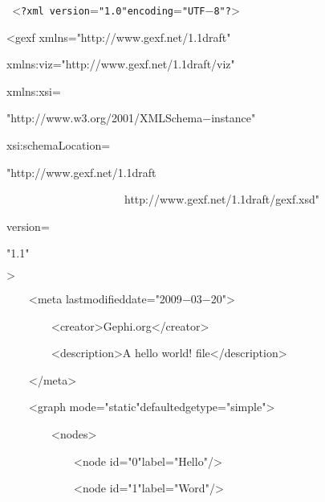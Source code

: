 


{
\tt
{\hlstd }{\hlkwa $\mathord{<}$?xml version$\mathord{=}$}{\hlstr "1.0"}{\hlkwa  encoding$\mathord{=}$}{\hlstr "UTF$\mathord{-}$8"}{\hlkwa ?$\mathord{>}$}{\hlstd }\leavevmode\par
{\hlkwa $\mathord{<}$gexf xmlns$\mathord{=}$}{\hlstr "http://www.gexf.net/1.1draft"}{\hlkwa }\leavevmode\par
{\hlstd  xmlns:viz$\mathord{=}$}{\hlstr "http://www.gexf.net/1.1draft/viz"}{\hlstd \leavevmode\par
 xmlns:xsi$\mathord{=}$}{\hlstr "http://www.w3.org/2001/XMLSchema$\mathord{-}$instance"}{\hlstd \leavevmode\par
 xsi:schemaLocation$\mathord{=}$}{\hlstr "http://www.gexf.net/1.1draft}\leavevmode\par
{\hlstr }{\hlstd\ \ \ \ \ \ \ \ \ \ \ \ \ \ \ \ \ \ \ \ \ }{\hlstr http://www.gexf.net/1.1draft/gexf.xsd"}{\hlstd \leavevmode\par
 version$\mathord{=}$}{\hlstr "1.1"}{\hlstd $\mathord{>}$\leavevmode\par
}{\hlstd\ \ \ \ }{\hlstd }{\hlkwa $\mathord{<}$meta lastmodifieddate$\mathord{=}$}{\hlstr "2009$\mathord{-}$03$\mathord{-}$20"}{\hlkwa $\mathord{>}$}{\hlstd \leavevmode\par
}{\hlstd\ \ \ \ \ \ \ \ }{\hlstd }{\hlkwa $\mathord{<}$creator$\mathord{>}$}{\hlstd Gephi.org}{\hlkwa $\mathord{<}$/creator$\mathord{>}$}{\hlstd \leavevmode\par
}{\hlstd\ \ \ \ \ \ \ \ }{\hlstd }{\hlkwa $\mathord{<}$description$\mathord{>}$}{\hlstd A hello world! file}{\hlkwa $\mathord{<}$/description$\mathord{>}$}{\hlstd \leavevmode\par
}{\hlstd\ \ \ \ }{\hlstd }{\hlkwa $\mathord{<}$/meta$\mathord{>}$}{\hlstd \leavevmode\par
}{\hlstd\ \ \ \ }{\hlstd }{\hlkwa $\mathord{<}$graph mode$\mathord{=}$}{\hlstr "static"}{\hlkwa  defaultedgetype$\mathord{=}$}{\hlstr "simple"}{\hlkwa $\mathord{>}$}{\hlstd \leavevmode\par
}{\hlstd\ \ \ \ \ \ \ \ }{\hlstd }{\hlkwa $\mathord{<}$nodes$\mathord{>}$}{\hlstd \leavevmode\par
}{\hlstd\ \ \ \ \ \ \ \ \ \ \ \ }{\hlstd }{\hlkwa $\mathord{<}$node id$\mathord{=}$}{\hlstr "0"}{\hlkwa  label$\mathord{=}$}{\hlstr "Hello"}{\hlkwa  /$\mathord{>}$}{\hlstd \leavevmode\par
}{\hlstd\ \ \ \ \ \ \ \ \ \ \ \ }{\hlstd }{\hlkwa $\mathord{<}$node id$\mathord{=}$}{\hlstr "1"}{\hlkwa  label$\mathord{=}$}{\hlstr "Word"}{\hlkwa  /$\mathord{>}$}{\hlstd \leavevmode\par
}}
